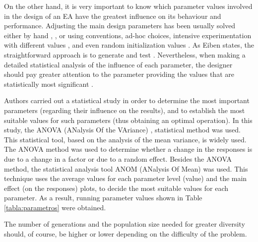 \documentclass[final,1p,times]{elsarticle}
\begin{document}
On the other hand, it is very important to know which parameter values involved in the design of an EA have the greatest influence on its behaviour and performance.
Adjusting the main design parameters has been usually solved either by hand \cite{Davis91}, \cite{Jagielska99},\cite{Das2009} or using conventions, ad-hoc choices, intensive experimentation with different values \cite{emss2007,smiteiben_paper_2009,eiben_tut_cec2009,smiteiben_paper_cec2009,SmitCEC2010}, and even random initialization values \cite{GongCEC2011}. As Eiben states, the straightforward approach is to generate and test \cite{DKim97,eiben_tut_cec2009,smiteiben_paper_cec2009}.
Nevertheless, when making a detailed statistical analysis of the influence of each parameter, the designer should pay greater attention to the parameter providing the values that are statistically most significant \cite{castillo2011}.

Authors carried out a statistical study \cite{CastilloIEEETNN} in order to determine the most important parameters (regarding their influence on the results), and to establish the most suitable values for such parameters (thus obtaining an optimal operation). In this study, the ANOVA (ANalysis Of the VAriance) \cite{Fisher25},\cite{Fisher36} statistical method was used. This statistical tool, based on the analysis of the mean variance, is widely used.
The ANOVA method was used to determine whether a change in the responses is due to a change in a factor or due to a random effect. Besides the ANOVA method, the statistical analysis tool ANOM (ANalysis Of Mean) was used. This technique uses the average values for each parameter level (value) and the main effect (on the responses) plots, to decide the most suitable values for each parameter. 
As a result, running parameter values shown in Table \ref{tabla:parametros} were obtained.

The number of generations and the population size needed for greater diversity should, of course, be higher or lower depending on the difficulty of the problem.

\end{document}
